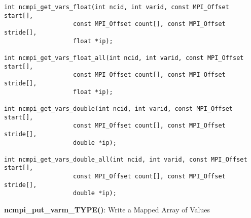 \begin{verbatim}
int ncmpi_get_vars_float(int ncid, int varid, const MPI_Offset start[],
                   const MPI_Offset count[], const MPI_Offset stride[],
                   float *ip);

int ncmpi_get_vars_float_all(int ncid, int varid, const MPI_Offset start[],
                   const MPI_Offset count[], const MPI_Offset stride[],
                   float *ip);

int ncmpi_get_vars_double(int ncid, int varid, const MPI_Offset start[],
                   const MPI_Offset count[], const MPI_Offset stride[],
                   double *ip);

int ncmpi_get_vars_double_all(int ncid, int varid, const MPI_Offset start[],
                   const MPI_Offset count[], const MPI_Offset stride[],
                   double *ip);
\end{verbatim}


{\bf ncmpi\_put\_varm\_TYPE()}: Write a Mapped Array of Values

